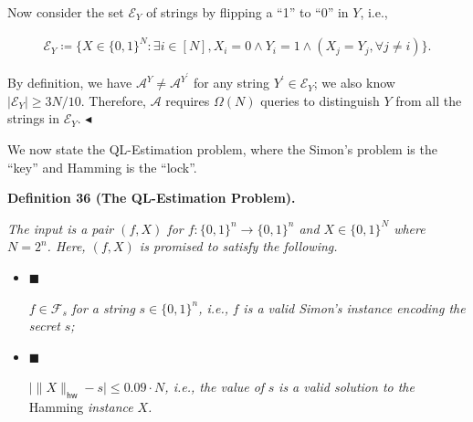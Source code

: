 \documentclass[10pt,a4paper]{article}
\begin{document}
Now consider the set $\mathcal{E}_{Y}$ of strings by flipping a “1” to “0” in $Y$, i.e.,\par


\[\begin{gathered}
\mathcal{E}_{Y}\coloneqq\{X\in\{0,1\}^{N}:\exists i\in[N],X_{i}=0\land Y_{i}=1\land(X_{j}=Y_{j},\forall j\neq i)\}.
\end{gathered}\]


By definition, we have $\mathcal{A}^{Y}\neq\mathcal{A}^{Y^{\prime}}$ for any string $Y^{\prime}\in\mathcal{E}_{Y}$; we also know $|\mathcal{E}_{Y}|\geq 3N/10$.
Therefore, $\mathcal{A}$ requires $\Omega(N)$ queries to distinguish $Y$ from all the strings in $\mathcal{E}_{Y}$.
$\blacktriangleleft$\par




We now state the QL-Estimation problem, where the Simon’s problem is the “key” and Hamming is the “lock”.\par





\par\medskip\noindent\textbf{
\textbf{Definition 36}\textbf{ }(The QL-Estimation Problem)\textbf{.}
}\par



\emph{The input is a pair $(f,X)$ for $f:\{0,1\}^{n}\rightarrow\{0,1\}^{n}$ and $X\in\{0,1\}^{N}$ where $N=2^{n}$. Here, $(f,X)$ is promised to satisfy the following.}\par


\begin{itemize}


\item[] 
$\blacksquare$ 


$f\in\mathcal{F}_{s}$\emph{ for a string }${s}\in\{0,1\}^{n}$\emph{, i.e., }$f$\emph{ is a valid Simon’s instance encoding the secret }$s$\emph{;}\par





\item[] 
$\blacksquare$ 


$\big|\|X\|_{\mathsf{hw}}-{s}\big|\leq 0.09\cdot N$\emph{, i.e., the value of }${s}$\emph{ is a valid solution to the }Hamming\emph{ instance }$X$\emph{.}\par





\end{itemize}
\end{document}
